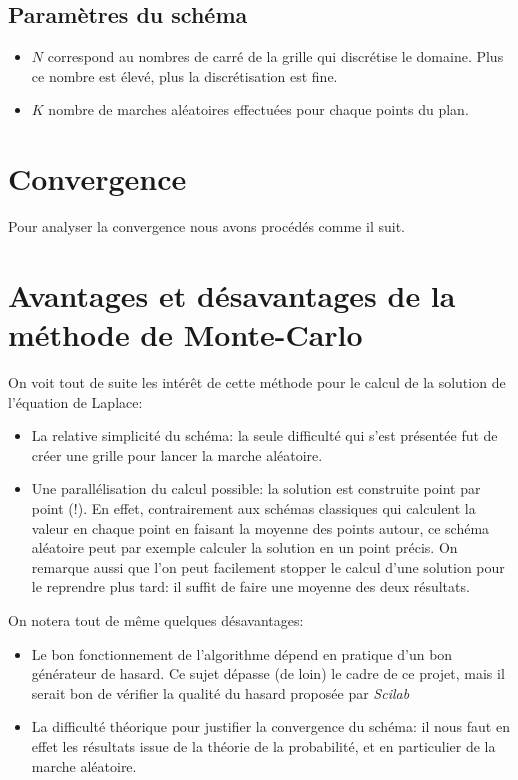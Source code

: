 \documentclass[11pt, a4paper]{article}
\begin{document}
\subsection{Paramètres du schéma}

\begin{itemize}
	\item $N$ correspond au nombres de carré de la grille qui discrétise le domaine. Plus ce nombre est
		élevé, plus la discrétisation est fine.
	\item $K$ nombre de marches aléatoires effectuées pour chaque points du plan.
\end{itemize}

\section{Convergence}

Pour analyser la convergence nous avons procédés comme il suit.

\section{Avantages et désavantages de la méthode de Monte-Carlo}

On voit tout de suite les intérêt de cette méthode pour le calcul de la solution de l'équation de
Laplace:
\begin{itemize}
	\item La relative simplicité du schéma: la seule difficulté qui s'est présentée fut de créer
		une grille pour lancer la marche aléatoire.
	\item Une parallélisation du calcul possible: la solution est construite point par point
		(!). En effet, contrairement aux schémas classiques qui calculent la valeur en
		chaque point en faisant la moyenne des points autour, ce schéma aléatoire peut par
		exemple calculer la solution en un point précis. On remarque aussi que l'on peut
		facilement stopper le calcul d'une solution pour le reprendre plus tard: il suffit
		de faire une moyenne des deux résultats.
\end{itemize}

On notera tout de même quelques désavantages:
\begin{itemize}
	\item Le bon fonctionnement de l'algorithme dépend en pratique d'un bon générateur de
		hasard. Ce sujet dépasse (de loin) le cadre de ce projet, mais il serait bon de
		vérifier la qualité du hasard proposée par \emph{Scilab}

	\item La difficulté théorique pour justifier la convergence du schéma: il nous faut en effet
		les résultats issue de la théorie de la probabilité, et en particulier de la marche
		aléatoire.
\end{itemize}
\end{document}
